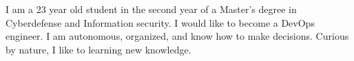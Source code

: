 
\begin{cvparagraph}
I am a 23 year old student in the second year of a Master's degree in Cyberdefense and Information security. 
I would like to become a DevOps engineer. I am autonomous, organized, and know how to make decisions. Curious by nature, I like to learning new knowledge.
\end{cvparagraph}
